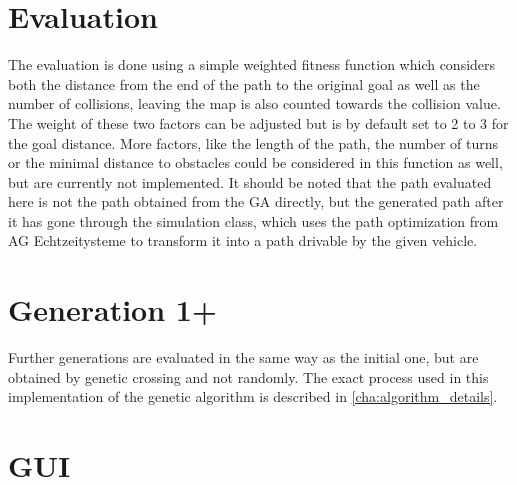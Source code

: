 \section{Evaluation} %
\label{sec:evaluation}

The evaluation is done using a simple weighted fitness function which considers both the distance from the end of the path to the original goal as well as the number of collisions, leaving the map is also counted towards the collision value. The weight of these two factors can be adjusted but is by default set to 2 to 3 for the goal distance. More factors, like the length of the path, the number of turns or the minimal distance to obstacles could be considered in this function as well, but are currently not implemented. It should be noted that the path evaluated here is not the path obtained from the GA directly, but the generated path after it has gone through the simulation class, which uses the path optimization from AG Echtzeitysteme to transform it into a path drivable by the given vehicle. 

\section{Generation 1+} %
\label{sec:generation_1+}

Further generations are evaluated in the same way as the initial one, but are obtained by genetic crossing and not randomly. The exact process used in this implementation of the genetic algorithm is described in \ref{cha:algorithm_details}.

\section{GUI}
\label{sec:gui}

